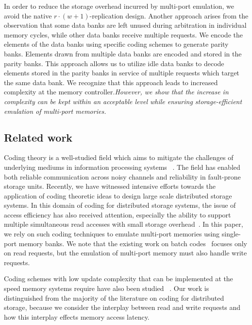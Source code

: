 In order to reduce the storage overhead incurred by multi-port emulation, we avoid the native $r\cdot(w + 1)$-replication design. Another approach arises from the observation that some data banks are left unused during arbitration in individual memory cycles, while other data banks receive multiple requests. We encode the elements of the data banks using specific coding schemes to generate parity banks. Elements drawn from multiple data banks are encoded and stored in the parity banks. This approach allows us to utilize idle data banks to decode elements stored in the parity banks in service of multiple requests which target the same data bank. We recognize that this approach leads to increased complexity at the memory controller.{\em However, we show that the increase in complexity can be kept within an acceptable level while ensuring storage-efficient emulation of multi-port memories.}

\subsection{Related work}

Coding theory is a well-studied field which aims to mitigate the challenges of underlying mediums in information processing systems ~\cite{MacSlo, Cover}. The field has enabled both reliable communication across noisy channels and reliability in fault-prone storage units. Recently, we have witnessed intensive efforts towards the application of coding theoretic ideas to design large scale distributed storage systems\cite{Azure, SAPDVCB13, Rashmi14}. In this domain of coding for distributed storage systems, the issue of access efficiency has also received attention, especially the ability to support multiple simultaneous read accesses with small storage overhead~\cite{batchcodes, RPDV16, RSDG16, Wang2017}. In this paper, we rely on such coding techniques to emulate multi-port memories using single-port memory banks. We note that the existing work on batch codes~\cite{batchcodes} focuses only on read requests, but the emulation of multi-port memory must also handle write requests. 

Coding schemes with low update complexity that can be implemented at the speed memory systems require have also been studied ~\cite{ASV10, MCW14}. Our work is distinguished from the majority of the literature on coding for distributed storage, because we consider the interplay between read and write requests and how this interplay effects memory access latency.

